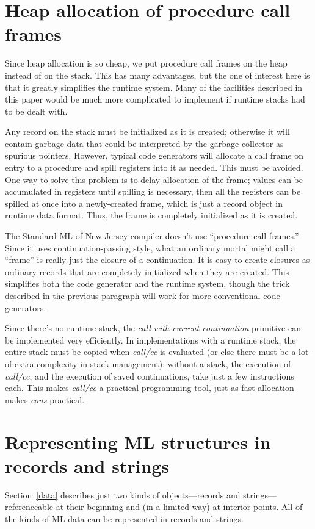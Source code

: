 \section{Heap allocation of procedure call frames}
\label{heap}

Since heap allocation is so cheap, we put procedure call frames on the
heap instead of on the stack.
This has many advantages\cite{appel89:cps},
but the one of interest here is that it greatly simplifies the runtime
system.  Many of the facilities described in this paper
would be much more complicated to implement if runtime stacks had to be
dealt with.

Any record on the stack must be initialized as it is created;
otherwise it will contain garbage data that could be interpreted
by the garbage collector as spurious pointers.  However, typical
code generators will allocate a call frame on
entry to a procedure and spill registers into it as needed.
This must be avoided.  One way to solve
this problem is to delay allocation of the frame; values can be accumulated
in registers until spilling is necessary, then all the registers can 
be spilled at once into a newly-created frame, which is just a record
object in runtime data format.  Thus, the frame is completely initialized
as it is created.

The Standard ML of New Jersey compiler doesn't use ``procedure call frames.''
Since it uses continuation-passing 
style\cite{steele78}\cite{kranz86}\cite{appel89:cps},
what an ordinary mortal might call a ``frame'' is really just the
closure of a continuation.  It is easy to create closures as ordinary
records that are completely initialized when they are created.
This simplifies both the code generator
and the runtime system, though the trick described in the previous paragraph
will work for more conventional code generators.

Since there's no runtime stack, the 
{\em call-with-current-continuation}\cite{rees86}
primitive can be implemented very efficiently.  In implementations
with a runtime stack, the entire stack must be copied when {\em call/cc}
is evaluated (or else there must be a lot of extra complexity in stack
management); without a stack, the execution of
{\em call/cc}, and the execution of
saved continuations, take just a few instructions each.  This makes
{\em call/cc} a practical programming tool, just as fast allocation
makes {\em cons} practical.

\section{Representing ML structures in records and strings}
\label{representing}
Section~\ref{data} describes just two kinds of 
objects---records and
strings---referenceable at their beginning and (in a limited way)
at interior points.  All of the kinds of ML data can be represented
in records and strings.

